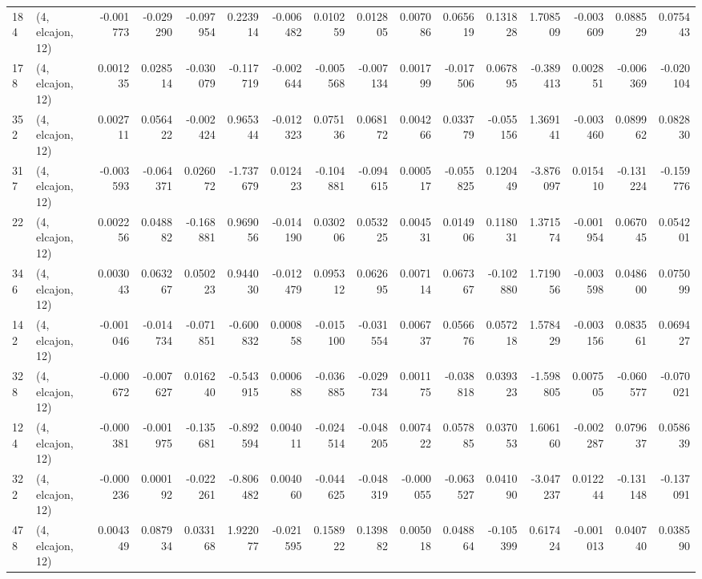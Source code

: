 \begin{tabular}{llrrrrrrrrrrrrrr}
184 &  (4, elcajon, 12) &  -0.001773 & -0.029290 & -0.097954 &    0.223914 & -0.006482 &   0.010259 &   0.012805 &  0.007086 &  0.065619 &  0.131828 &    1.708509 & -0.003609 &   0.088529 &   0.075443 \\
178 &  (4, elcajon, 12) &   0.001235 &  0.028514 & -0.030079 &   -0.117719 & -0.002644 &  -0.005568 &  -0.007134 &  0.001799 & -0.017506 &  0.067895 &   -0.389413 &  0.002851 &  -0.006369 &  -0.020104 \\
352 &  (4, elcajon, 12) &   0.002711 &  0.056422 & -0.002424 &    0.965344 & -0.012323 &   0.075136 &   0.068172 &  0.004266 &  0.033779 & -0.055156 &    1.369141 & -0.003460 &   0.089962 &   0.082830 \\
317 &  (4, elcajon, 12) &  -0.003593 & -0.064371 &  0.026072 &   -1.737679 &  0.012423 &  -0.104881 &  -0.094615 &  0.000517 & -0.055825 &  0.120449 &   -3.876097 &  0.015410 &  -0.131224 &  -0.159776 \\
22  &  (4, elcajon, 12) &   0.002256 &  0.048882 & -0.168881 &    0.969056 & -0.014190 &   0.030206 &   0.053225 &  0.004531 &  0.014906 &  0.118031 &    1.371574 & -0.001954 &   0.067045 &   0.054201 \\
346 &  (4, elcajon, 12) &   0.003043 &  0.063267 &  0.050223 &    0.944030 & -0.012479 &   0.095312 &   0.062695 &  0.007114 &  0.067367 & -0.102880 &    1.719056 & -0.003598 &   0.048600 &   0.075099 \\
142 &  (4, elcajon, 12) &  -0.001046 & -0.014734 & -0.071851 &   -0.600832 &  0.000858 &  -0.015100 &  -0.031554 &  0.006737 &  0.056676 &  0.057218 &    1.578429 & -0.003156 &   0.083561 &   0.069427 \\
328 &  (4, elcajon, 12) &  -0.000672 & -0.007627 &  0.016240 &   -0.543915 &  0.000688 &  -0.036885 &  -0.029734 &  0.001175 & -0.038818 &  0.039323 &   -1.598805 &  0.007505 &  -0.060577 &  -0.070021 \\
124 &  (4, elcajon, 12) &  -0.000381 & -0.001975 & -0.135681 &   -0.892594 &  0.004011 &  -0.024514 &  -0.048205 &  0.007422 &  0.057885 &  0.037053 &    1.606160 & -0.002287 &   0.079637 &   0.058639 \\
322 &  (4, elcajon, 12) &  -0.000236 &  0.000192 & -0.022261 &   -0.806482 &  0.004060 &  -0.044625 &  -0.048319 & -0.000055 & -0.063527 &  0.041090 &   -3.047237 &  0.012244 &  -0.131148 &  -0.137091 \\
478 &  (4, elcajon, 12) &   0.004349 &  0.087934 &  0.033168 &    1.922077 & -0.021595 &   0.158922 &   0.139882 &  0.005018 &  0.048864 & -0.105399 &    0.617424 & -0.001013 &   0.040740 &   0.038590 \\

\end{tabular}
